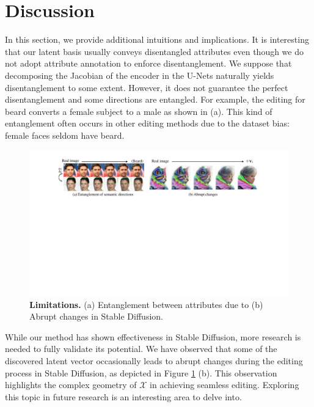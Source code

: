 \section{Discussion}
In this section, we provide additional intuitions and implications. It is interesting that our latent basis usually conveys disentangled attributes even though we do not adopt attribute annotation to enforce disentanglement. We suppose that decomposing the Jacobian of the encoder in the U-Nets naturally yields disentanglement to some extent. 
However, it does not guarantee the perfect disentanglement and some directions are entangled. For example, the editing for beard converts a female subject to a male as shown in  (a). This kind of entanglement often occurs in other editing methods due to the dataset bias: female faces seldom have beard.

\begin{figure}[!t]
    \centering
    \includegraphics[width=1.0\linewidth]{figure/limitation.pdf}
    \vspace{-1.5em}
    \caption{
    \textbf{Limitations.} (a) Entanglement between attributes due to 
    (b) Abrupt changes in Stable Diffusion.}
    \vspace{-1em}
    \label{fig:limitation}
\end{figure}

While our method has shown effectiveness in Stable Diffusion, more research is needed to fully validate its potential.
We have observed that some of the discovered latent vector occasionally leads to abrupt changes during the editing process in Stable Diffusion, as depicted in Figure \ref{fig:limitation} (b). 
This observation highlights the complex geometry of $\mathcal{X}$ in achieving seamless editing. Exploring this topic in future research is an interesting area to delve into.

